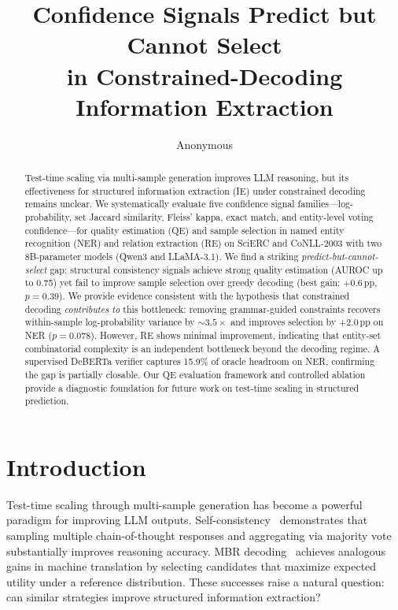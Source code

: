 \documentclass[11pt,a4paper]{article}
\title{Confidence Signals Predict but Cannot Select\\in Constrained-Decoding Information Extraction}
\author{Anonymous}
\begin{document}
\maketitle

\begin{abstract}
Test-time scaling via multi-sample generation improves LLM reasoning, but its effectiveness for structured information extraction (IE) under constrained decoding remains unclear. We systematically evaluate five confidence signal families---log-probability, set Jaccard similarity, Fleiss' kappa, exact match, and entity-level voting confidence---for quality estimation (QE) and sample selection in named entity recognition (NER) and relation extraction (RE) on SciERC and CoNLL-2003 with two 8B-parameter models (Qwen3 and LLaMA-3.1).
We find a striking \emph{predict-but-cannot-select} gap: structural consistency signals achieve strong quality estimation (AUROC up to 0.75) yet fail to improve sample selection over greedy decoding (best gain: +0.6\,pp, $p{=}0.39$). We provide evidence consistent with the hypothesis that constrained decoding \emph{contributes to} this bottleneck: removing grammar-guided constraints recovers within-sample log-probability variance by ${\sim}3.5{\times}$ and improves selection by +2.0\,pp on NER ($p{=}0.078$). However, RE shows minimal improvement, indicating that entity-set combinatorial complexity is an independent bottleneck beyond the decoding regime. A supervised DeBERTa verifier captures 15.9\% of oracle headroom on NER, confirming the gap is partially closable. Our QE evaluation framework and controlled ablation provide a diagnostic foundation for future work on test-time scaling in structured prediction.
\end{abstract}

\section{Introduction}

Test-time scaling through multi-sample generation has become a powerful paradigm for improving LLM outputs. Self-consistency~\cite{wang2023selfconsistency} demonstrates that sampling multiple chain-of-thought responses and aggregating via majority vote substantially improves reasoning accuracy. MBR decoding~\cite{eikema2022sampling} achieves analogous gains in machine translation by selecting candidates that maximize expected utility under a reference distribution. These successes raise a natural question: can similar strategies improve structured information extraction?
\end{document}
